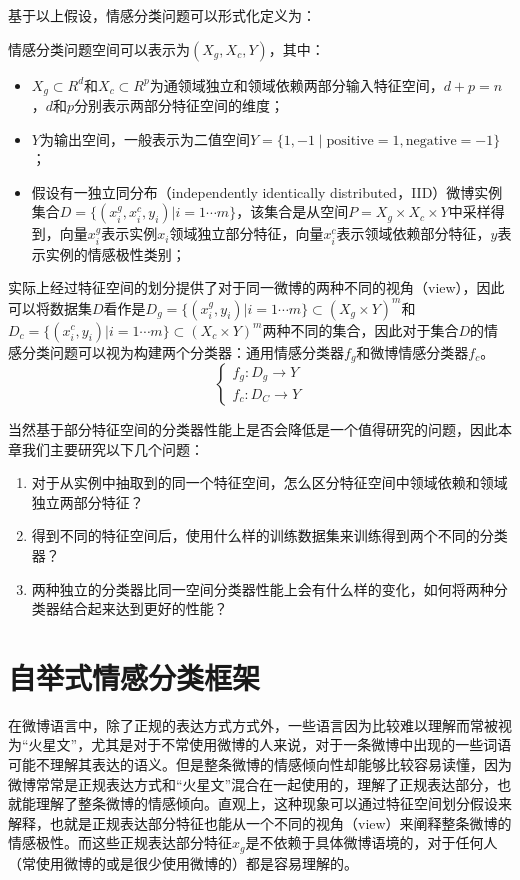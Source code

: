 基于以上假设，情感分类问题可以形式化定义为：
\begin{definition}[基于特征空间划分的情感分类]
情感分类问题空间可以表示为$(X_{g},X_{c},Y)$，其中：
\begin{itemize}
\item $ X_{g}\subset R^d$和$ X_{c}\subset R^p$为通领域独立和领域依赖两部分输入特征空间，$d+p=n$，$ d $和$ p $分别表示两部分特征空间的维度；
\item $Y$为输出空间，一般表示为二值空间$ Y=\lbrace 1,-1\mid \mathrm{positive}=1,\mathrm{negative}=-1 \rbrace$；
\item 假设有一独立同分布（independently identically distributed，IID）微博实例集合$D=\{(x_i^g,x_i^c,y_i)|i=1\cdots m\}$，该集合是从空间$P=X_g \times X_c \times Y$中采样得到，向量$x_i^g$表示实例$ x_i $领域独立部分特征，向量$x_i^c$表示领域依赖部分特征，$y$表示实例的情感极性类别；
\end{itemize}
实际上经过特征空间的划分提供了对于同一微博的两种不同的视角（view），因此可以将数据集$D$看作是$D_g=\{(x_i^g,y_i)|i=1\cdots m\} \subset (X_g \times Y)^m$和$D_c=\{(x_i^c,y_i)|i=1\cdots m\} \subset (X_c \times Y)^m$两种不同的集合，因此对于集合$D$的情感分类问题可以视为构建两个分类器：通用情感分类器$ f_g $和微博情感分类器$ f_c $。
\begin{equation}
\begin{cases}
f_g:D_g \rightarrow Y\\
f_c:D_C \rightarrow Y
\end{cases}
\end{equation}
\end{definition}

当然基于部分特征空间的分类器性能上是否会降低是一个值得研究的问题，因此本章我们主要研究以下几个问题：
\begin{enumerate}
\item 对于从实例中抽取到的同一个特征空间，怎么区分特征空间中领域依赖和领域独立两部分特征？
\item 得到不同的特征空间后，使用什么样的训练数据集来训练得到两个不同的分类器？
\item 两种独立的分类器比同一空间分类器性能上会有什么样的变化，如何将两种分类器结合起来达到更好的性能？
\end{enumerate}

\section{自举式情感分类框架}
\label{ch4_frame}
在微博语言中，除了正规的表达方式方式外，一些语言因为比较难以理解而常被视为“火星文”，尤其是对于不常使用微博的人来说，对于一条微博中出现的一些词语可能不理解其表达的语义。但是整条微博的情感倾向性却能够比较容易读懂，因为微博常常是正规表达方式和“火星文”混合在一起使用的，理解了正规表达部分，也就能理解了整条微博的情感倾向。直观上，这种现象可以通过特征空间划分假设来解释，也就是正规表达部分特征也能从一个不同的视角（view）来阐释整条微博的情感极性。而这些正规表达部分特征$ x_{g} $是不依赖于具体微博语境的，对于任何人（常使用微博的或是很少使用微博的）都是容易理解的。

